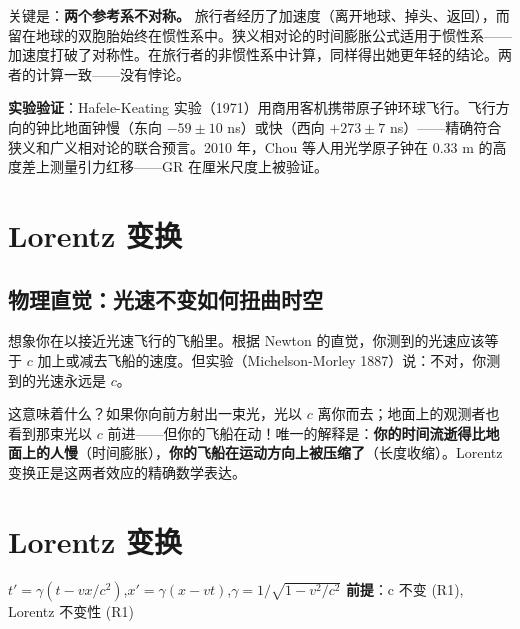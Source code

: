 关键是：\textbf{两个参考系不对称。} 旅行者经历了加速度（离开地球、掉头、返回），而留在地球的双胞胎始终在惯性系中。狭义相对论的时间膨胀公式适用于惯性系——加速度打破了对称性。在旅行者的非惯性系中计算，同样得出她更年轻的结论。两者的计算一致——没有悖论。

\textbf{实验验证}：Hafele-Keating 实验（1971）用商用客机携带原子钟环球飞行。飞行方向的钟比地面钟慢（东向 $-59\pm10$ ns）或快（西向 $+273\pm7$ ns）——精确符合狭义和广义相对论的联合预言。2010 年，Chou 等人用光学原子钟在 0.33 m 的高度差上测量引力红移——GR 在厘米尺度上被验证。

\section{Lorentz 变换}

\subsection{物理直觉：光速不变如何扭曲时空}

想象你在以接近光速飞行的飞船里。根据 Newton 的直觉，你测到的光速应该等于 $c$ 加上或减去飞船的速度。但实验（Michelson-Morley 1887）说：不对，你测到的光速永远是 $c$。

这意味着什么？如果你向前方射出一束光，光以 $c$ 离你而去；地面上的观测者也看到那束光以 $c$ 前进——但你的飞船在动！唯一的解释是：\textbf{你的时间流逝得比地面上的人慢}（时间膨胀），\textbf{你的飞船在运动方向上被压缩了}（长度收缩）。Lorentz 变换正是这两者效应的精确数学表达。


\section{Lorentz 变换}

\begin{lawbox}[Lorentz 变换]
  $t' = \gamma(t - vx/c^2)$,\quad $x' = \gamma(x - vt)$,\quad $\gamma = 1/\sqrt{1 - v^2/c^2}$
  \quad\textbf{前提}：c 不变 (R1), Lorentz 不变性 (R1)
\end{lawbox}


